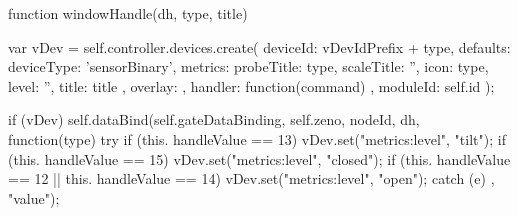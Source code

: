 \begin{listingverbatim}
function windowHandle(dh, type, title) {
	var vDev = self.controller.devices.create({
	deviceId: vDevIdPrefix + type,
	defaults: {
		deviceType: 'sensorBinary',
		metrics: {
			probeTitle: type,
			scaleTitle: '',
			icon: type,
			level: '',
			title: title
		}
	},
	overlay: {},
	handler: function(command) {},
	moduleId: self.id
});

if (vDev) {
	self.dataBind(self.gateDataBinding, self.zeno, nodeId, dh, 
	function(type) {
		try {
			if (this. handleValue == 13)
				vDev.set("metrics:level", "tilt");
			if (this. handleValue == 15)
				vDev.set("metrics:level", "closed");
			if (this. handleValue == 12 || this. handleValue == 14)
				vDev.set("metrics:level", "open");
		} catch (e) {}
	}, "value");
}
}
\end{listingverbatim}